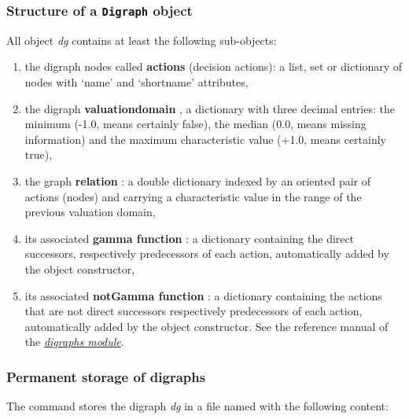 \documentclass[letterpaper,10pt,english]{sphinxmanual}
\begin{document}
\subsubsection{Structure of a \texttt{Digraph} object}
\label{tutorial:structure-of-a-digraph-object}
All  object \emph{dg} contains at least the following sub-objects:
\begin{enumerate}
\item {} 
the digraph nodes called \textbf{actions} (decision actions): a list, set or dictionary of nodes with `name' and `shortname' attributes,

\item {} 
the digraph \textbf{valuationdomain} , a dictionary with three decimal entries: the minimum (-1.0, means certainly false), the median (0.0, means missing information) and the maximum characteristic value (+1.0, means certainly true),

\item {} 
the graph \textbf{relation} : a double dictionary indexed by an oriented pair of actions (nodes) and carrying a characteristic value in the range of the previous valuation domain,

\item {} 
its associated \textbf{gamma function} : a dictionary containing the direct successors, respectively predecessors of each action, automatically added by the object constructor,

\item {} 
its associated \textbf{notGamma function} : a dictionary containing the actions that are not direct successors respectively predecessors of each action, automatically added by the object constructor. See the reference manual of the {\hyperref[techDoc:digraphs-label]{\emph{digraphs module}}}.

\end{enumerate}


\subsubsection{Permanent storage of digraphs}
\label{tutorial:permanent-storage-of-digraphs}
The  command stores the digraph \emph{dg} in a file named  with the following content:
\end{document}
